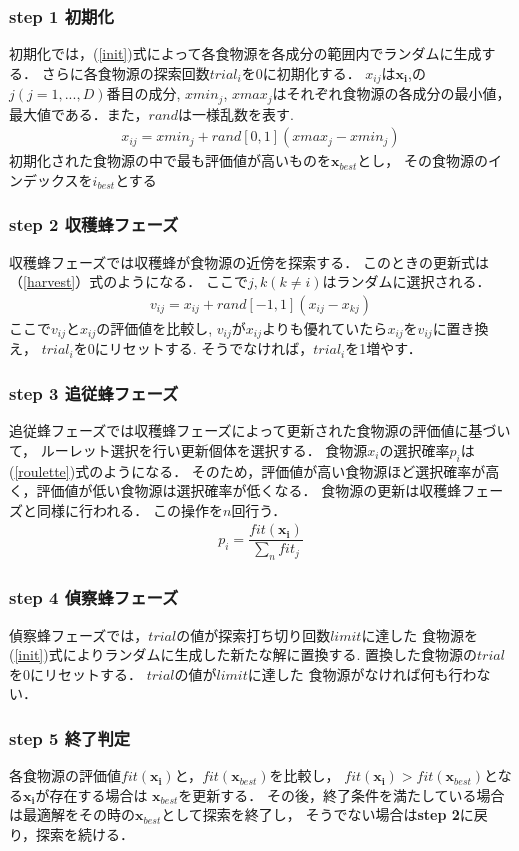 \subsubsection*{step 1 初期化}
初期化では，(\ref{init})式によって各食物源を各成分の範囲内でランダムに生成する．
さらに各食物源の探索回数$trial_i$を0に初期化する．
$x_{ij}$は$\boldsymbol{x_{i}}$,の$j(j=1,...,D)$番目の成分, 
$xmin_j$, $xmax_j$はそれぞれ食物源の各成分の最小値，最大値である．また，$rand$は一様乱数を表す. 
\begin{align}
    x_{ij} = xmin_j + rand[0,1](xmax_j-xmin_j)\label{init}
\end{align}
初期化された食物源の中で最も評価値が高いものを$\boldsymbol{x}_{best}$とし，
その食物源のインデックスを$i_{best}$とする
\subsubsection*{step 2 収穫蜂フェーズ}
収穫蜂フェーズでは収穫蜂が食物源の近傍を探索する．
このときの更新式は（\ref{harvest}）式のようになる．
ここで$j,k(k\neq i)$はランダムに選択される．
\begin{align}
v_{ij} = x_{ij} + rand[-1,1](x_{ij}-x_{kj})\label{harvest}
\end{align}
ここで$v_{ij}$と$x_{ij}$の評価値を比較し, $v_{ij}$が$x_{ij}$よりも優れていたら$x_{ij}$を$v_{ij}$に置き換え，
$trial_i$を0にリセットする.
そうでなければ，$trial_i$を1増やす．
\subsubsection*{step 3 追従蜂フェーズ}
追従蜂フェーズでは収穫蜂フェーズによって更新された食物源の評価値に基づいて，
ルーレット選択を行い更新個体を選択する．
食物源$x_i$の選択確率$p_i$は(\ref{roulette})式のようになる．
そのため，評価値が高い食物源ほど選択確率が高く，評価値が低い食物源は選択確率が低くなる．
食物源の更新は収穫蜂フェーズと同様に行われる．
この操作を$n$回行う．
\begin{align}
    p_i = \dfrac{fit(\boldsymbol{x_{i}})}{\sum_{n}fit_j}\label{roulette}
\end{align}
\subsubsection*{step 4 偵察蜂フェーズ}
偵察蜂フェーズでは，$trial$の値が探索打ち切り回数$limit$に達した
食物源を(\ref{init})式によりランダムに生成した新たな解に置換する. 
置換した食物源の$trial$を0にリセットする．
$trial$の値が$limit$に達した
食物源がなければ何も行わない．
\subsubsection*{step 5 終了判定}
各食物源の評価値$fit(\boldsymbol{x_{i}})$と，$fit(\boldsymbol{x}_{best})$を比較し，
$fit(\boldsymbol{x_{i}}) > fit(\boldsymbol{x}_{best})$となる$\boldsymbol{x_{i}}$が存在する場合は
$\boldsymbol{x}_{best}$を更新する．
その後，終了条件を満たしている場合は最適解をその時の$\boldsymbol{x}_{best}$として探索を終了し，
そうでない場合は\textbf{step 2}に戻り，探索を続ける．
